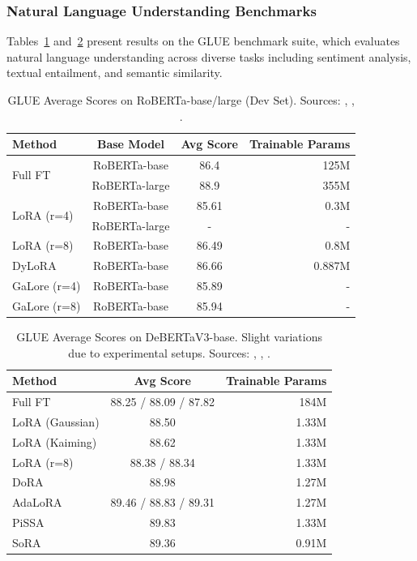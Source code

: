 \subsubsection{Natural Language Understanding Benchmarks}

Tables~\ref{tab:glue-roberta} and~\ref{tab:glue-deberta} present results on the GLUE benchmark suite, which evaluates natural language understanding across diverse tasks including sentiment analysis, textual entailment, and semantic similarity.

\begin{table}[H]
  \centering
  \caption{GLUE Average Scores on RoBERTa-base/large (Dev Set). Sources: \cite{hu2021lora}, \cite{valipour2022dylora}, \cite{zhao2024galore}.}
  \label{tab:glue-roberta}
  \begin{tabular}{lccr}
    \toprule
    Method & Base Model & Avg Score & Trainable Params \\
    \midrule
    \multirow{2}{*}{Full FT} & RoBERTa-base & 86.4 & 125M \\
    & RoBERTa-large & 88.9 & 355M \\
    \multirow{2}{*}{LoRA (r=4)} & RoBERTa-base & 85.61 & 0.3M \\
    & RoBERTa-large & - & - \\
    LoRA (r=8) & RoBERTa-base & 86.49 & 0.8M \\
    DyLoRA & RoBERTa-base & 86.66 & 0.887M \\
    GaLore (r=4) & RoBERTa-base & 85.89 & - \\
    GaLore (r=8) & RoBERTa-base & 85.94 & - \\
    \bottomrule
  \end{tabular}
\end{table}

\begin{table}[H]
  \centering
  \caption{GLUE Average Scores on DeBERTaV3-base. Slight variations due to experimental setups. Sources: \cite{meng2024pissa}, \cite{zhang2023adalora}, \cite{ding2023sora}.}
  \label{tab:glue-deberta}
  \begin{tabular}{lcr}
    \toprule
    Method & Avg Score & Trainable Params \\
    \midrule
    Full FT & 88.25 / 88.09 / 87.82 & 184M \\
    LoRA (Gaussian) & 88.50 & 1.33M \\
    LoRA (Kaiming) & 88.62 & 1.33M \\
    LoRA (r=8) & 88.38 / 88.34 & 1.33M \\
    DoRA & 88.98 & 1.27M \\
    AdaLoRA & 89.46 / 88.83 / 89.31 & 1.27M \\
    PiSSA & 89.83 & 1.33M \\
    SoRA & 89.36 & 0.91M \\
    \bottomrule
  \end{tabular}
\end{table}

